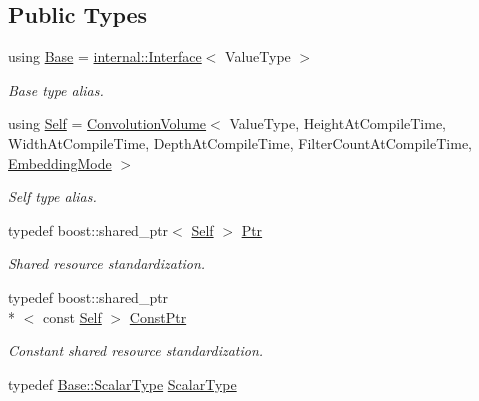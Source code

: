 \subsection*{Public Types}
\begin{DoxyCompactItemize}
\item 
using \hyperlink{classffnn_1_1layer_1_1_convolution_volume_a2f94a7f13a3236ad743973de4bf1f555}{Base} = \hyperlink{classffnn_1_1layer_1_1internal_1_1_interface}{internal\-::\-Interface}$<$ Value\-Type $>$
\begin{DoxyCompactList}\small\item\em Base type alias. \end{DoxyCompactList}\item 
using \hyperlink{classffnn_1_1layer_1_1_convolution_volume_abd19bf15edd2f076cda0a71deb21cd69}{Self} = \hyperlink{classffnn_1_1layer_1_1_convolution_volume}{Convolution\-Volume}$<$ Value\-Type, Height\-At\-Compile\-Time, Width\-At\-Compile\-Time, Depth\-At\-Compile\-Time, Filter\-Count\-At\-Compile\-Time, \hyperlink{namespaceffnn_1_1layer_a254f16beba4fb335d935e9b43bb9e69a}{Embedding\-Mode} $>$
\begin{DoxyCompactList}\small\item\em Self type alias. \end{DoxyCompactList}\item 
typedef boost\-::shared\-\_\-ptr$<$ \hyperlink{classffnn_1_1layer_1_1_convolution_volume_abd19bf15edd2f076cda0a71deb21cd69}{Self} $>$ \hyperlink{classffnn_1_1layer_1_1_convolution_volume_a34fd376bc786013ed79837acafae0645}{Ptr}
\begin{DoxyCompactList}\small\item\em Shared resource standardization. \end{DoxyCompactList}\item 
typedef boost\-::shared\-\_\-ptr\\*
$<$ const \hyperlink{classffnn_1_1layer_1_1_convolution_volume_abd19bf15edd2f076cda0a71deb21cd69}{Self} $>$ \hyperlink{classffnn_1_1layer_1_1_convolution_volume_ae43bab766fff2856d2ae2bbef73e6416}{Const\-Ptr}
\begin{DoxyCompactList}\small\item\em Constant shared resource standardization. \end{DoxyCompactList}\item 
typedef \hyperlink{classffnn_1_1layer_1_1internal_1_1_interface_a7f834e3365e5199bcbcd16d9abd63941}{Base\-::\-Scalar\-Type} \hyperlink{classffnn_1_1layer_1_1_convolution_volume_aa9435c5ef8e0d2aa5cf57d2a2758a615}{Scalar\-Type}

\end{DoxyCompactItemize}

